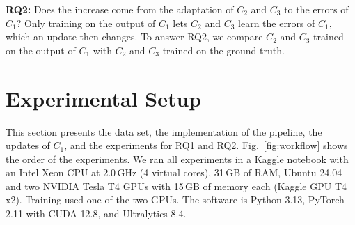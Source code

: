 \documentclass[conference]{IEEEtran}
\begin{document}
\noindent\textbf{RQ2:} Does the increase come from the adaptation of $C_2$ and $C_3$ to the errors of $C_1$? Only training on the output of $C_1$ lets $C_2$ and $C_3$ learn the errors of $C_1$, which an update then changes. To answer RQ2, we compare $C_2$ and $C_3$ trained on the output of $C_1$ with $C_2$ and $C_3$ trained on the ground truth.

\section{Experimental Setup}

This section presents the data set, the implementation of the pipeline, the updates of $C_1$, and the experiments for RQ1 and RQ2. Fig.~\ref{fig:workflow} shows the order of the experiments. We ran all experiments in a Kaggle notebook with an Intel Xeon CPU at 2.0\,GHz (4 virtual cores), 31\,GB of RAM, Ubuntu 24.04 and two NVIDIA Tesla T4 GPUs with 15\,GB of memory each (Kaggle GPU T4 x2). Training used one of the two GPUs. The software is Python 3.13, PyTorch 2.11 with CUDA 12.8, and Ultralytics 8.4.
\end{document}
